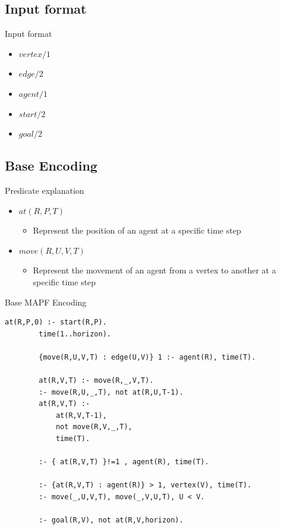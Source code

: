 


\subsection{Input format}
\begin{frame}{Input format}
    \begin{itemize}
        \item \(vertex/1\) 
        \item \(edge/2\)
        \item \(agent/1\) 
        \item \(start/2\) 
        \item \(goal/2\) 
    \end{itemize}
\end{frame}




\subsection{Base Encoding}
\begin{frame}[fragile]{Predicate explanation}
    \begin{itemize}
        \item \(at(R,P,T)\)
        \begin{itemize}
            \item Represent the position of an agent at a specific time step
        \end{itemize}
        \item \(move(R,U,V,T)\)
         \begin{itemize}
            \item Represent the movement of an agent from a vertex to another at a specific time step
        \end{itemize}
    \end{itemize}
\end{frame}




\begin{frame}[fragile]{Base MAPF Encoding}
    \begin{lstlisting}[style=mystyle, caption={Base MAPF Encoding}]
        at(R,P,0) :- start(R,P). 
        time(1..horizon).
    
        {move(R,U,V,T) : edge(U,V)} 1 :- agent(R), time(T). 
    
        at(R,V,T) :- move(R,_,V,T). 
        :- move(R,U,_,T), not at(R,U,T-1). 
        at(R,V,T) :- 
            at(R,V,T-1), 
            not move(R,V,_,T), 
            time(T). 
    
        :- { at(R,V,T) }!=1 , agent(R), time(T). 
    
        :- {at(R,V,T) : agent(R)} > 1, vertex(V), time(T). 
        :- move(_,U,V,T), move(_,V,U,T), U < V. 
            
        :- goal(R,V), not at(R,V,horizon). 
    \end{lstlisting}
\end{frame}


